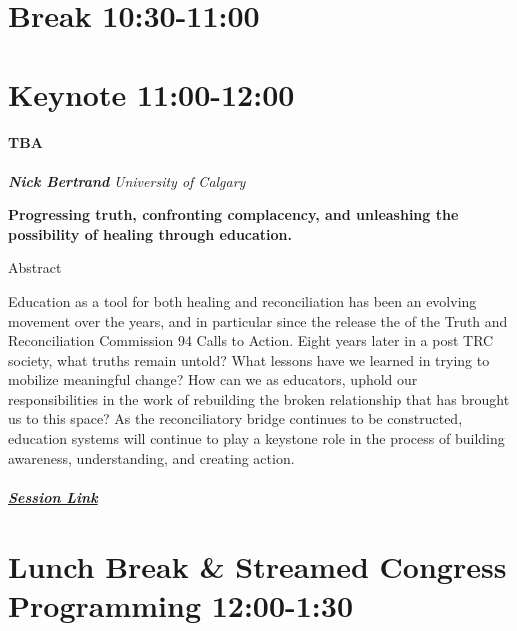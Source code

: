 \documentclass[
]{book}
\begin{document}
\hypertarget{break-1030-1100-2}{%
\section*{Break \textbar{} 10:30-11:00}\label{break-1030-1100-2}}

\hypertarget{keynote-1100-1200-1}{%
\section*{Keynote \textbar{} 11:00-12:00}\label{keynote-1100-1200-1}}

\begin{keynote}
\hypertarget{tba}{%
\paragraph*{TBA}\label{tba}}

\textbf{\emph{Nick Bertrand}} \textbar{} \emph{University of Calgary}

\textbf{Progressing truth, confronting complacency, and unleashing the
possibility of healing through education.}

Abstract

Education as a tool for both healing and reconciliation has been an
evolving movement over the years, and in particular since the release
the of the Truth and Reconciliation Commission 94 Calls to Action. Eight
years later in a post TRC society, what truths remain untold? What
lessons have we learned in trying to mobilize meaningful change? How can
we as educators, uphold our responsibilities in the work of rebuilding
the broken relationship that has brought us to this space? As the
reconciliatory bridge continues to be constructed, education systems
will continue to play a keystone role in the process of building
awareness, understanding, and creating action.

\hypertarget{session-link}{%
\subparagraph*{\texorpdfstring{\href{}{Session
Link}}{Session Link}}\label{session-link}}
\end{keynote}

\hypertarget{lunch-break-streamed-congress-programming-1200-130-1}{%
\section*{Lunch Break \& Streamed Congress Programming \textbar{} 12:00-1:30}\label{lunch-break-streamed-congress-programming-1200-130-1}}
\end{document}

